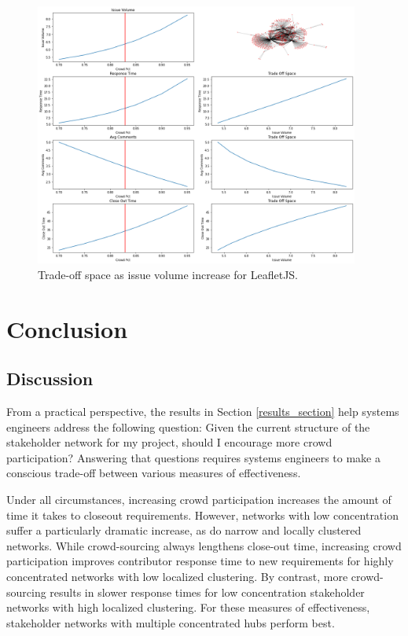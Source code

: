 \begin{figure}
  \includegraphics[width=0.95\textwidth]{leaflet_trade_space.png}
\caption{Trade-off space as issue volume increase for LeafletJS.}
\label{leaflet_trade_space}
\end{figure}

\section{Conclusion}

\subsection{Discussion}

From a practical perspective, the results in Section \ref{results_section} help systems engineers address the following question: Given the current structure of the stakeholder network for my project, should I encourage more crowd participation? Answering that questions requires systems engineers to make a conscious trade-off between various measures of effectiveness.

Under all circumstances, increasing crowd participation increases the amount of time it takes to closeout requirements. However, networks with low concentration suffer a particularly dramatic increase, as do narrow and locally clustered networks. While crowd-sourcing always lengthens close-out time, increasing crowd participation improves contributor response time to new requirements for highly concentrated networks with low localized clustering. By contrast, more crowd-sourcing results in slower response times for low concentration stakeholder networks with high localized clustering. For these measures of effectiveness, stakeholder networks with multiple concentrated hubs perform best.

